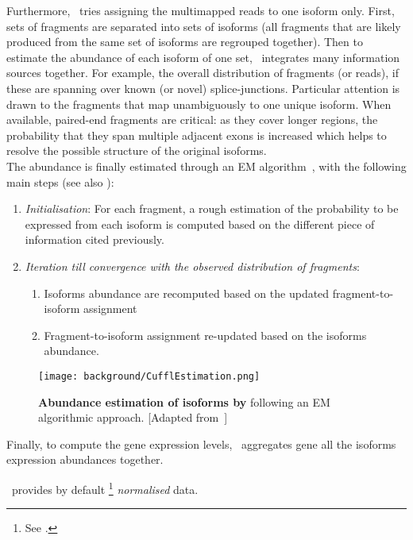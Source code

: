 Furthermore, \cuffl\ tries assigning the multimapped reads to one isoform only.
First, sets of fragments are separated into sets of isoforms
(all fragments that are likely produced from the same set of isoforms
are regrouped together).
Then to estimate the abundance of each isoform of one set,
\cuffl\ integrates many information sources together.
For example, the overall distribution of fragments
(or reads), if these are spanning over known (or novel) splice-junctions.
Particular attention is drawn to the fragments that map unambiguously to one
unique isoform. When available, paired-end fragments are critical:
as they cover longer regions, the probability
that they span multiple adjacent exons is increased which helps to resolve
the possible structure of the original isoforms. \\
The abundance is finally estimated through
an \gls{EM} algorithm~,
with the following main steps (see also ):
\begin{enumerate}
    \item \emph{Initialisation}: For each fragment, a rough estimation of the
        probability to be expressed from each isoform is computed based on the
        different piece of information cited previously.
\item \emph{Iteration till convergence with the observed distribution of fragments}:
    \begin{enumerate}
        \item Isoforms abundance are recomputed based on the updated
            fragment-to-isoform assignment
        \item Fragment-to-isoform assignment re-updated based on the isoforms
            abundance.
    \end{enumerate}
\end{enumerate}


\begin{figure}
    \texttt{[image: background/CufflEstimation.png]}\centering
    \caption[Abundance estimation of isoforms by
    Cufflinks]{\label{fig:cuffEstimation}\textbf{Abundance estimation of isoforms
    by \cuffl} following an \gls{EM} algorithmic approach. [Adapted
    from~\citet{Turner2015}]}
\end{figure}

Finally, to compute the gene expression levels, \cuffl\ aggregates 
gene all the isoforms expression abundances together.

\cuffl\ provides by default \FPKM\footnote{See .}
\emph{normalised} data.

